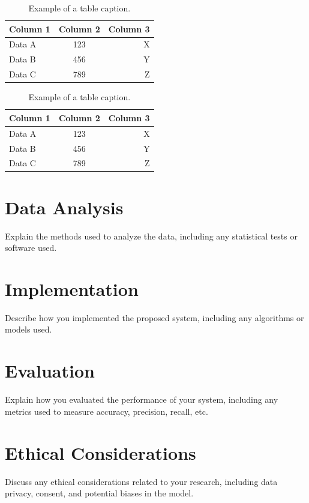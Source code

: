 \documentclass[12pt]{report}
\begin{document}
\lipsum[1-2] %

\begin{table}[htbp]
  \centering
  \caption{Example of a table caption.}
  \label{tab:example1}
  \begin{tabular}{|l|c|r|}
    \hline
    Column 1 & Column 2 & Column 3 \\
    \hline
    Data A   & 123      & X \\
    Data B   & 456      & Y \\
    Data C   & 789      & Z \\
    \hline
  \end{tabular}
\end{table}

\begin{table}[htbp]
  \centering
  \caption{Example of a table caption.}
  \label{tab:example2}
  \begin{tabular}{lcr}
    \toprule
    Column 1 & Column 2 & Column 3 \\
    \midrule
    Data A   & 123      & X \\
    Data B   & 456      & Y \\
    Data C   & 789      & Z \\
    \bottomrule
  \end{tabular}
\end{table}

\section{Data Analysis}
Explain the methods used to analyze the data, including any statistical tests or software used.
\section{Implementation}
Describe how you implemented the proposed system, including any algorithms or models used.
\section{Evaluation}
Explain how you evaluated the performance of your system, including any metrics used to measure accuracy, precision, recall, etc.
\section{Ethical Considerations}
Discuss any ethical considerations related to your research, including data privacy, consent, and potential biases in the model.
\end{document}
